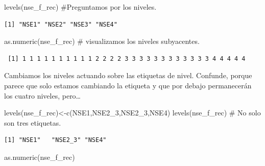 \documentclass[
  letterpaper,
  DIV=11,
  numbers=noendperiod]{scrreprt}
\newenvironment{Shaded}{\begin{snugshade}}{\end{snugshade}}
\newcommand{\CommentTok}[1]{\textcolor[rgb]{0.37,0.37,0.37}{#1}}
\newcommand{\FunctionTok}[1]{\textcolor[rgb]{0.28,0.35,0.67}{#1}}
\newcommand{\NormalTok}[1]{\textcolor[rgb]{0.00,0.23,0.31}{#1}}
\newcommand{\OtherTok}[1]{\textcolor[rgb]{0.00,0.23,0.31}{#1}}
\newcommand{\StringTok}[1]{\textcolor[rgb]{0.13,0.47,0.30}{#1}}
\begin{document}
\begin{Shaded}
\begin{Highlighting}[]
\FunctionTok{levels}\NormalTok{(nse\_f\_rec) }\CommentTok{\#Preguntamos por los niveles.}
\end{Highlighting}
\end{Shaded}

\begin{verbatim}
[1] "NSE1" "NSE2" "NSE3" "NSE4"
\end{verbatim}

\begin{Shaded}
\begin{Highlighting}[]
\FunctionTok{as.numeric}\NormalTok{(nse\_f\_rec) }\CommentTok{\# visualizamos los niveles subyacentes.}
\end{Highlighting}
\end{Shaded}

\begin{verbatim}
 [1] 1 1 1 1 1 1 1 1 1 1 2 2 2 2 3 3 3 3 3 3 3 3 3 3 3 3 4 4 4 4 4
\end{verbatim}

Cambiamos los niveles actuando sobre las etiquetas de nivel. Confunde,
porque parece que solo estamos cambiando la etiqueta y que por debajo
permanecerán los cuatro niveles, pero\ldots{}

\begin{Shaded}
\begin{Highlighting}[]
\FunctionTok{levels}\NormalTok{(nse\_f\_rec)}\OtherTok{\textless{}{-}}\FunctionTok{c}\NormalTok{(}\StringTok{\textquotesingle{}NSE1\textquotesingle{}}\NormalTok{,}\StringTok{\textquotesingle{}NSE2\_3\textquotesingle{}}\NormalTok{,}\StringTok{\textquotesingle{}NSE2\_3\textquotesingle{}}\NormalTok{,}\StringTok{\textquotesingle{}NSE4\textquotesingle{}}\NormalTok{)  }
\FunctionTok{levels}\NormalTok{(nse\_f\_rec) }\CommentTok{\# No solo son tres etiquetas.}
\end{Highlighting}
\end{Shaded}

\begin{verbatim}
[1] "NSE1"   "NSE2_3" "NSE4"  
\end{verbatim}

\begin{Shaded}
\begin{Highlighting}[]
\FunctionTok{as.numeric}\NormalTok{(nse\_f\_rec)}
\end{Highlighting}
\end{Shaded}
\end{document}
